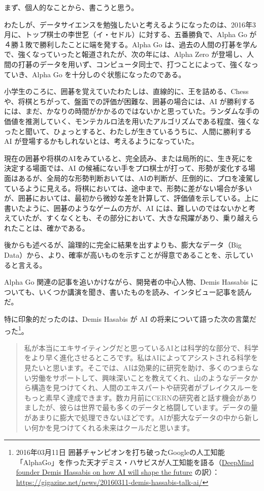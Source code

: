 \documentclass[
]{bxjsbook}
\theoremstyle{definition}
\theoremstyle{definition}
\theoremstyle{definition}
\theoremstyle{definition}
\theoremstyle{remark}
\begin{document}
まず、個人的なことから、書こうと思う。

わたしが、データサイエンスを勉強したいと考えるようになったのは、2016年3月に、トップ棋士の李世乭（イ・セドル）に対する、五番勝負で、Alpha Go が ４勝１敗で勝利したことに端を発する。Alpha Go は、過去の人間の打碁を学んで、強くなっていったと報道されたが、次の年には、Alpha Zero が登場し、人間の打碁のデータを用いず、コンピュータ同士で、打つことによって、強くなっていき、Alpha Go を十分しのぐ状態になったのである。

小学生のころに、囲碁を覚えていたわたしは、直線的に、王を詰める、Chess や、将棋とちがって、盤面での評価が困難な、囲碁の場合には、AI が勝利するには、まだ、かなりの時間がかかるのではないかと思っていた。ランダムな手の価値を推測していく、モンテカルロ法を用いたアルゴリズムである程度、強くなったと聞いて、ひょっとすると、わたしが生きているうちに、人間に勝利する AI が登場するかもしれないとは、考えるようになっていた。

現在の囲碁や将棋のAIをみていると、完全読み、または局所的に、生き死にを決定する場面では、AI の候補にない手をプロ棋士が打って、形勢が変化する場面はあるが、全局的な形勢判断おいては、AIの判断が、圧倒的に、プロを凌駕しているように見える。将棋においては、途中まで、形勢に差がない場合が多いが、囲碁においては、最初から微妙な差を計算して、評価値を示している。上に書いたように、囲碁のようなゲームの方が、AI には、難しいのではないかと考えていたが、すくなくとも、その部分において、大きな飛躍があり、乗り越えられたことは、確かである。

後からも述べるが、論理的に完全に結果を出すよりも、膨大なデータ（Big Data）から、より、確率が高いものを示すことが得意であることを、示していると言える。

Alpha Go 関連の記事を追いかけながら、開発者の中心人物、Demis Hassabis についても、いくつか講演を聞き、書いたものを読み、インタビュー記事を読んだ。

特に印象的だったのは、Demis Hasabis が AI の将来について語った次の言葉だった\footnote{2016年03月11日 囲碁チャンピオンを打ち破ったGoogleの人工知能「AlphaGo」を作った天才デミス・ハサビスが人工知能を語る（\href{https://www.theverge.com/2016/3/10/11192774/demis-hassabis-interview-alphago-google-deepmind-ai}{DeepMind founder Demis Hassabis on how AI will shape the future} の訳）：\url{https://gigazine.net/news/20160311-demis-hassabis-talk-ai/}}。

\begin{quote}
私が本当にエキサイティングだと思っているAIとは科学的な部分で、科学をより早く進化させるところです。私はAIによってアシストされる科学を見たいと思います。そこでは、AIは効果的に研究を助け、多くのつまらない労働をサポートして、興味深いことを教えてくれ、山のようなデータから構造を見つけてくれ、人間のエキスパートや研究者がブレイクスルーをもっと素早く達成できます。数カ月前にCERNの研究者と話す機会がありましたが、彼らは世界で最も多くのデータと格闘しています。データの量があまりに膨大で処理できないほどです。AIが膨大なデータの中から新しい何かを見つけてくれる未来はクールだと思います。
\end{quote}
\end{document}

